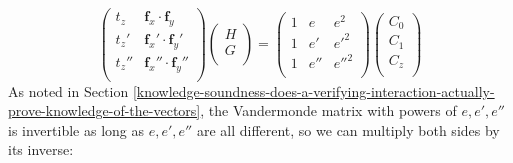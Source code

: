 \documentclass[10pt,a4paper]{article}
\begin{document}
\[
\begin{pmatrix}
t_z & \textbf{f}_x \cdot \textbf{f}_y \\
t_z' & \textbf{f}_x' \cdot \textbf{f}_y' \\
t_z'' & \textbf{f}_x'' \cdot \textbf{f}_y'' \\
\end{pmatrix}
\begin{pmatrix}
H\\
G\\
\end{pmatrix}
=\begin{pmatrix}
1 & e & e^2 \\
1 & e' & e'^2 \\
1 & e'' & e''^2 \\
\end{pmatrix}
\begin{pmatrix}
C_0\\
C_1\\
C_z\\
\end{pmatrix}
\]
As noted in Section \ref{knowledge-soundness-does-a-verifying-interaction-actually-prove-knowledge-of-the-vectors},
the Vandermonde matrix with powers of $e, e', e''$ is invertible as long as $e, e', e''$ are
all different, so we can multiply both sides by its inverse:
\end{document}
